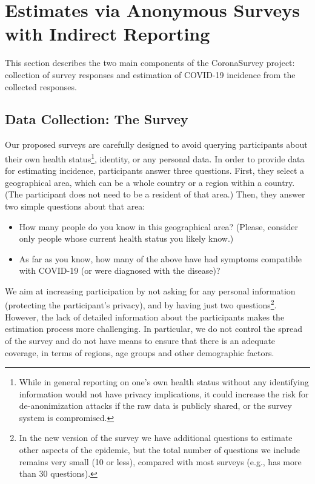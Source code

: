 \documentclass[sigconf]{acmart}
\begin{document}
\section{Estimates via Anonymous Surveys with Indirect Reporting}

This section describes the two main components of the CoronaSurvey project: collection of survey responses and estimation of COVID-19 incidence from the collected responses.

\subsection{Data Collection: The Survey}

Our proposed surveys are carefully designed to avoid querying participants about their own health status\footnote{While in general reporting on one's own health status without any identifying information would not have privacy implications, it could increase the risk for de-anonimization attacks if the raw data is publicly shared, or the survey system is compromised.}, identity, or any personal data. In order to provide data for estimating incidence, participants answer three questions. First, they select a geographical area, which can be a whole country or a region within a country. (The participant does not need to be a resident of that area.)  Then, they answer two simple questions about that area: 
\begin{itemize}
\item How many people do you know in this geographical area? (Please, consider only people whose current health status you likely know.)
\item As far as you know, how many of the above have had symptoms compatible with COVID-19 (or were diagnosed with the disease)?
\end{itemize}

We aim at increasing participation by not asking for any personal information (protecting the participant's privacy), and by having just two questions\footnote{In the new version of the survey we have additional questions to estimate other aspects of the epidemic, but the total number of questions we include remains very small (10 or less), compared with most surveys (e.g., \cite{FB-survey} has more than 30 questions).}. However, the lack of detailed information about the participants makes the estimation process more challenging. In particular, we do not control the spread of the survey and do not have means to ensure that there is an adequate coverage, in terms of regions, age groups and other demographic factors. 
\end{document}
